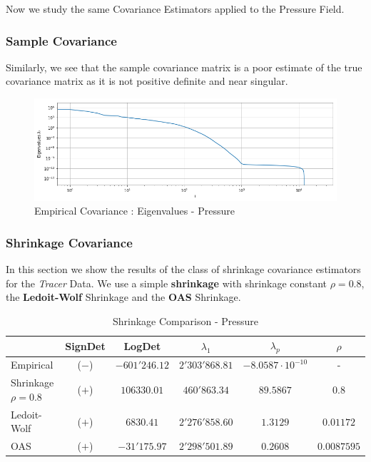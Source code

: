 Now we study the same Covariance Estimators applied to the Pressure Field. 


\subsubsection{Sample Covariance}

Similarly, we see that the sample covariance matrix is a poor estimate of the true covariance matrix as it is not positive definite and near singular. 

\begin{figure}[h!]
\centering
    \includegraphics[width=0.8\linewidth]{figures/Covariance/Pressure_23643/cov_emp_eigenval_loglog}
    \caption{Empirical Covariance : Eigenvalues - Pressure}
    \label{fig:cov:emp:eigs}
\end{figure}

\subsubsection{Shrinkage Covariance}

In this section we show the results of the class of shrinkage covariance estimators for the \textit{Tracer} Data. We use a simple \textbf{shrinkage} with shrinkage constant $\rho = 0.8$,  the \textbf{Ledoit-Wolf} Shrinkage and the \textbf{OAS} Shrinkage. 

\begin{table}[h]
\centering
    \begin{tabular}{l|ccccc}
     \toprule
        & SignDet & LogDet & $\lambda_1$ & $\lambda_p$ & $\rho$ \\ \midrule
        Empirical & ($-$) & $-601'246.12$ &  $2'303'868.81$ & $-8.0587 \cdot 10^{-10}$ & -\\
        Shrinkage $\rho=0.8$ & ($+$) & $106330.01$ &  $460'863.34$  &$89.5867$ & $0.8$\\
        Ledoit-Wolf & ($+$) & $6830.41$&  $2'276'858.60$ & $1.3129$ & $0.01172$\\
        OAS & ($+$) & $-31'175.97$ & $2'298'501.89$ & $0.2608$ & $0.0087595$ \\  \bottomrule
    \end{tabular}
    \caption{Shrinkage Comparison - Pressure}
\end{table}

